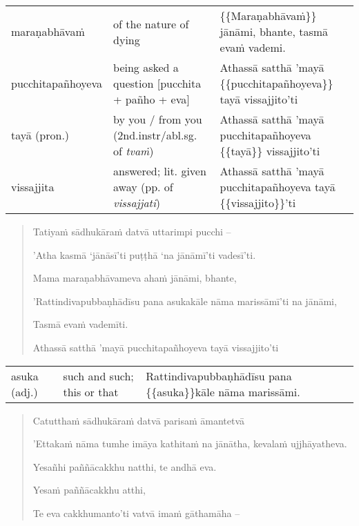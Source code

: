\documentclass[11pt,oneside]{memoir}
\begin{document}
\begin{longtable}{L{\colOne} L{\colTwo} H}
maraṇabhāvaṁ & of the nature of dying & \{\{Maraṇabhāvaṁ\}\} jānāmi, bhante, tasmā evaṁ vademi.\\[0pt]
pucchitapañhoyeva & being asked a question [pucchita + pañho + eva] & Athassā satthā 'mayā \{\{pucchitapañhoyeva\}\} tayā vissajjito'ti\\[0pt]
tayā (pron.) & by you / from you (2nd.instr/abl.sg. of \emph{tvaṁ}) & Athassā satthā 'mayā pucchitapañhoyeva \{\{tayā\}\} vissajjito'ti\\[0pt]
vissajjita & answered; lit. given away (pp. of \emph{vissajjati}) & Athassā satthā 'mayā pucchitapañhoyeva tayā \{\{vissajjito\}\}'ti\\[0pt]
\end{longtable}


\clearpage

\begin{quote}
Tatiyaṁ sādhukāraṁ datvā uttarimpi pucchi –

'Atha kasmā `jānāsī'ti puṭṭhā `na jānāmī'ti vadesī'ti.

Mama maraṇabhāvameva ahaṁ jānāmi, bhante,

'Rattindivapubbaṇhādīsu pana asukakāle nāma marissāmī'ti na jānāmi,

Tasmā evaṁ vademīti.

Athassā satthā 'mayā pucchitapañhoyeva tayā vissajjito'ti
\end{quote}

\begin{longtable}{L{\colOne} L{\colTwo} H}
asuka (adj.) & such and such; this or that & Rattindivapubbaṇhādīsu pana \{\{asuka\}\}kāle nāma marissāmi.\\[0pt]
\end{longtable}


\clearpage

\begin{quote}
Catutthaṁ sādhukāraṁ datvā parisaṁ āmantetvā

'Ettakaṁ nāma tumhe imāya kathitaṁ na jānātha, kevalaṁ ujjhāyatheva.

Yesañhi paññācakkhu natthi, te andhā eva.

Yesaṁ paññācakkhu atthi,

Te eva cakkhumanto'ti vatvā imaṁ gāthamāha –
\end{quote}
\end{document}
